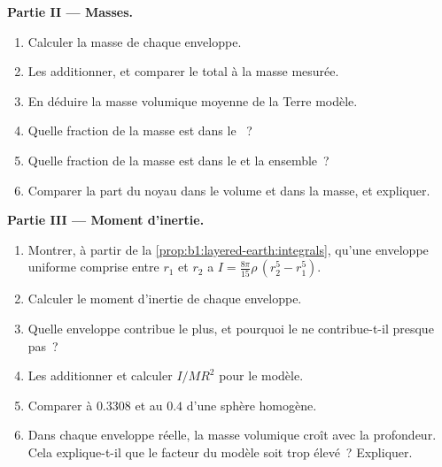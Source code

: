 \begin{problem}
\noindent\textbf{Partie II --- Masses.}
\begin{enumerate}[resume]
  \item Calculer la masse de chaque enveloppe.
  \item Les additionner, et comparer le total à la masse mesurée.
  \item En déduire la masse volumique moyenne de la Terre modèle.
  \item Quelle fraction de la masse est dans le ~?
  \item Quelle fraction de la masse est dans le  et la  ensemble~?
  \item Comparer la part du noyau dans le volume et dans la masse, et expliquer.
\end{enumerate}

\noindent\textbf{Partie III --- Moment d'inertie.}
\begin{enumerate}[resume]
  \item Montrer, à partir de la \cref{prop:b1:layered-earth:integrals}, qu'une
        enveloppe uniforme comprise entre $r_1$ et $r_2$ a
        $I = \tfrac{8\pi}{15}\rho\,(r_2^5 - r_1^5)$.
  \item Calculer le moment d'inertie de chaque enveloppe.
  \item Quelle enveloppe contribue le plus, et pourquoi le  ne
        contribue-t-il presque pas~?
  \item Les additionner et calculer $I/MR^2$ pour le modèle.
  \item Comparer à $0.3308$ et au $0.4$ d'une sphère homogène.
  \item Dans chaque enveloppe réelle, la masse volumique croît avec la profondeur.
        Cela explique-t-il que le facteur du modèle soit trop élevé~? Expliquer.
\end{enumerate}


\end{problem}
